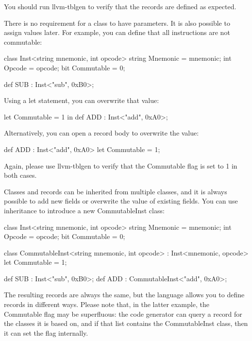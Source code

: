 You should run llvm-tblgen to verify that the records are defined as expected.

There is no requirement for a class to have parameters. It is also possible to assign values later. For example, you can define that all instructions are not commutable:

\begin{shell}
class Inst<string mnemonic, int opcode> {
    string Mnemonic = mnemonic;
    int Opcode = opcode;
    bit Commutable = 0;
}

def SUB : Inst<"sub", 0xB0>;
\end{shell}

Using a let statement, you can overwrite that value:

\begin{shell}
let Commutable = 1 in
    def ADD : Inst<"add", 0xA0>;
\end{shell}

Alternatively, you can open a record body to overwrite the value:

\begin{shell}
def ADD : Inst<"add", 0xA0> {
    let Commutable = 1;
}
\end{shell}

Again, please use llvm-tblgen to verify that the Commutable flag is set to 1 in both cases.

Classes and records can be inherited from multiple classes, and it is always possible to add new fields or overwrite the value of existing fields. You can use inheritance to introduce a new CommutableInst class:

\begin{shell}
class Inst<string mnemonic, int opcode> {
    string Mnemonic = mnemonic;
    int Opcode = opcode;
    bit Commutable = 0;
}

class CommutableInst<string mnemonic, int opcode>
    : Inst<mnemonic, opcode> {
    let Commutable = 1;
}

def SUB : Inst<"sub", 0xB0>;
def ADD : CommutableInst<"add", 0xA0>;
\end{shell}

The resulting records are always the same, but the language allows you to define records in different ways. Please note that, in the latter example, the Commutable flag may be superfluous: the code generator can query a record for the classes it is based on, and if that list contains the CommutableInst class, then it can set the flag internally.


